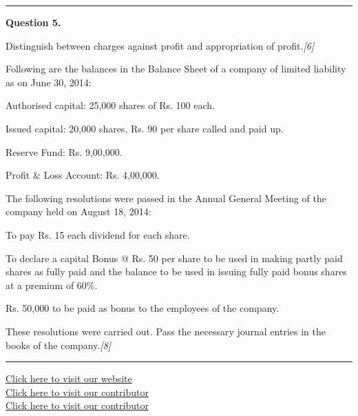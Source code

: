 \documentclass[11pt,a4paper]{article}
\newcommand{\pts}[1]{\hfill   \textit{[#1]}}
\begin{document}
\medskip\rule{\linewidth}{0.2pt}


\newpage




\noindent   \textbf{Question 5.}

\begin{parts}
  \item Distinguish between charges against profit and appropriation of profit.\pts{6}
  \item Following are the balances in the Balance Sheet of a company of limited liability as on June 30, 2014:
  
\begin{parts}
    \item Authorised capital: 25,000 shares of Rs. 100 each.
    \item Issued capital: 20,000 shares, Rs. 90 per share called and paid up.
    \item Reserve Fund: Rs. 9,00,000.
    \item Profit \& Loss Account: Rs. 4,00,000.
  \end{parts}
  The following resolutions were passed in the Annual General Meeting of the company held on August 18, 2014:
  
\begin{parts}
    \item To pay Rs. 15 each dividend for each share.
    \item To declare a capital Bonus @ Rs. 50 per share to be used in making partly paid shares as fully paid and the balance to be used in issuing fully paid bonus shares at a premium of 60\%.
    \item Rs. 50,000 to be paid as bonus to the employees of the company.
  \end{parts}
  These resolutions were carried out. Pass the necessary journal entries in the books of the company.\pts{8}
\end{parts}

\vfill
\rule{\linewidth}{0.4pt}

\begin{center}\small
\href{https://bhu-exam.vercel.app/}{Click here to visit our website}\\[4pt]
\href{https://me-aryan.vercel.app/}{Click here to visit our contributor}\\[4pt]
\href{https://quashan-me.vercel.app/}{Click here to visit our contributor}
\end{center}
\end{document}
